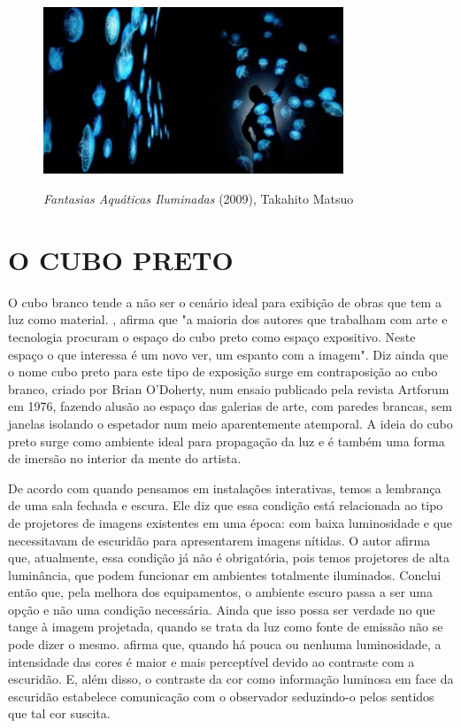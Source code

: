 \begin{figure}[H]
  \begin{center}
    \caption{\textit{Fantasias Aquáticas Iluminadas} (2009), Takahito Matsuo}
    \vspace*{0,2cm}
    \includegraphics[width=0.8\textwidth]{./04-figuras/takahito_matsuo}
    \label{fig:takahito_matsuo}
  \end{center}
  \vspace*{-0,9cm}
\end{figure}

\section{O CUBO PRETO}

O cubo branco tende a não ser o cenário ideal para exibição de obras que tem a luz como material. , afirma que "a maioria dos autores que trabalham com arte e tecnologia procuram o espaço do cubo preto como espaço expositivo. Neste espaço o que interessa é um novo ver, um espanto com a imagem". Diz ainda que o nome cubo preto para este tipo de exposição surge em contraposição ao cubo branco, criado por Brian O'Doherty, num ensaio publicado pela revista Artforum em 1976, fazendo alusão ao espaço das galerias de arte, com paredes brancas, sem janelas isolando o espetador num meio aparentemente atemporal. A ideia do cubo preto surge como ambiente ideal para propagação da luz e é também uma forma de imersão no interior da mente do artista.

De acordo com  quando pensamos em instalações interativas, temos a lembrança de uma sala fechada e escura. Ele diz que essa condição está relacionada ao tipo de projetores de imagens existentes em uma época: com baixa luminosidade e que necessitavam de escuridão para apresentarem imagens nítidas. O autor afirma que, atualmente, essa condição já não é obrigatória, pois temos projetores de alta luminância, que podem funcionar em ambientes totalmente iluminados. Conclui então que, pela melhora dos equipamentos, o ambiente escuro passa a ser uma opção e não uma condição necessária. Ainda que isso possa ser verdade no que tange à imagem projetada, quando se trata da luz como fonte de emissão não se pode dizer o mesmo.  afirma que, quando há pouca ou nenhuma luminosidade, a intensidade das cores é maior e mais perceptível devido ao contraste com a escuridão. E, além disso, o contraste da cor como informação luminosa em face da escuridão estabelece comunicação com o observador seduzindo-o pelos sentidos que tal cor suscita.


